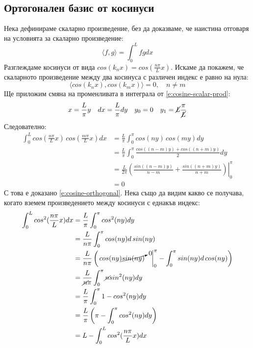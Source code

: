 \documentclass[12pt]{article}
\numberwithin{equation}{section}
\begin{document}
\subsection{Ортогонален базис от косинуси}
\label{a:cosin-basis}
Нека дефинираме скаларно произведение, без да доказваме, че наистина отговаря на условията за скаларно произведение:
\begin{equation}
    \label{e:cosine-scalar-prod}
    \langle f,g \rangle = \int_0^L fg dx
\end{equation}
Разглеждаме косинуси от вида $cos(k_n x) = cos(\frac{n \pi}{L} x)$. Искаме да покажем, че скаларното произведение между два косинуса с различен индекс е равно на нула:
\begin{equation}
    \label{e:cosine-orthogonal}
    \langle cos(k_n x),cos(k_m x) \rangle = 0, \quad n \neq m
\end{equation}
Ще приложим смяна на променливата в интеграла от \autoref{e:cosine-scalar-prod}:
\begin{align}
    x = \frac{L}{\pi} y && dx = \frac{L}{\pi}dy && y_0=0 && y_1=\cancel{L}\frac{\pi}{\cancel{L}}
\end{align}
Следователно:
\begin{equation}
    \begin{aligned}
        \int_0^L cos(\frac{n\pi}{L}x) \, cos(\frac{m\pi}{L}x) dx
        &= \frac{L}{\pi}\int_0^\pi cos(ny) \, cos(my) dy \\
        &= \frac{L}{\pi}\int_0^\pi \frac{cos((n-m)y) + cos((n+m)y)}{2} dy \\
        &= \frac{L}{2\pi}\left. \left( \frac{sin((n-m)y)}{n-m} + \frac{sin((n+m)y)}{n+m} \right) \right|_0^\pi \\
        &= 0
    \end{aligned}
\end{equation}
С това е доказано \autoref{e:cosine-orthogonal}. Нека също да видим какво се получава, когато вземем произведението между косинуси с еднакъв индекс:
\begin{equation}
    \begin{aligned}
        \int_0^L cos^2(\frac{n\pi}{L}x) dx
        &= \frac{L}{\pi}\int_0^\pi cos^2(ny) dy \\
        &= \frac{L}{n\pi}\int_0^\pi cos(ny) d \, sin(ny) \\
        &= \frac{L}{n\pi}\left( \left. \vphantom{\int} cos(ny)\cancelto{0}{sin(ny)} \quad \right|_0^\pi - \int_0^\pi sin(ny) d \, cos(ny) \right) \\
        &= \frac{L}{\cancel{n}\pi}\int_0^\pi \cancel{n} sin^2(ny) dy \\
        &= \frac{L}{\pi}\int_0^\pi 1 - cos^2(ny) dy \\
        &= \frac{L}{\pi} \left(\pi - \int_0^\pi cos^2(ny) dy \right) \\
        &= L - \int_0^L cos^2(\frac{n\pi}{L}x) dx
    \end{aligned}
\end{equation}
\end{document}
